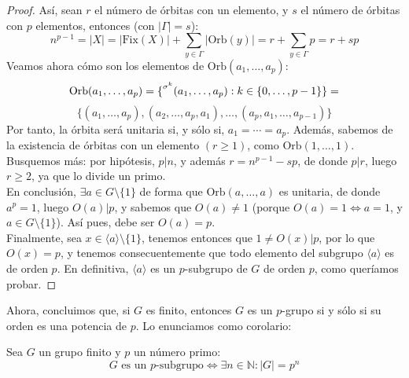 \documentclass[12pt]{article}
\newcommand{\N}{\mathbb{N}}
\newcommand{\Fix}{\text{Fix}}
\newcommand{\Orb}{\text{Orb}}
\begin{document}
\begin{ejercicio}
\begin{proof}
            Así, sean $r$ el número de órbitas con un elemento, y $s$ el número de órbitas con $p$ elementos, entonces (con $|\Gamma| = s$):
            $$n^{p-1} = |X| = |\Fix(X)| + \sum_{y \in \Gamma} |\Orb(y)| = r + \sum_{y \in \Gamma} p = r + sp$$
            Veamos ahora cómo son los elementos de $\Orb(a_1, \ldots, a_p)$:
            $$\Orb(a_1, \ldots, a_p) = \{\prescript{\sigma^{k}}{}{(a_1, \ldots, a_p)} : k \in \{0, \ldots, p-1\}\} = $$ 
            $$\{(a_1, \ldots, a_p), (a_2, \ldots, a_p, a_1), \ldots, (a_p, a_1, \ldots, a_{p-1})\}$$
            Por tanto, la órbita será unitaria si, y sólo si, $a_1 = \cdots = a_p$. Además, sabemos de la existencia de órbitas con un elemento $(r \geqslant 1)$, como $\Orb(1, \ldots, 1)$. Busquemos más: por hipótesis, $p | n$, y además $r = n^{p-1} - sp$, de donde $p | r$, luego $r \geqslant 2$, ya que lo divide un primo. \\

            En conclusión, $\exists a \in G \setminus \{1\}$ de forma que $\Orb(a, \ldots, a)$ es unitaria, de donde $a^{p} = 1$, luego $O(a) | p$, y sabemos que $O(a) \neq 1$ (porque $O(a) = 1 \iff a = 1$, y $a \in G \setminus \{1\}$). Así pues, debe ser $O(a) = p$. \\

            Finalmente, sea $x \in \langle a \rangle \setminus \{1\}$, tenemos entonces que $1 \neq O(x) | p$, por lo que $O(x) = p$, y tenemos consecuentemente que todo elemento del subgrupo $\langle a \rangle$ es de orden $p$. En definitiva, $\langle a \rangle$ es un $p$-subgrupo de $G$ de orden $p$, como queríamos probar.
        \end{proof}

        Ahora, concluimos que, si $G$ es finito, entonces $G$ es un $p$-grupo si y sólo si su orden es una potencia de $p$. Lo enunciamos como corolario:

        \begin{coro}
            Sea $G$ un grupo finito y $p$ un número primo:
            $$G \text{ es un $p$-subgrupo} \iff \exists n \in \N : |G| = p^{n}$$
        \end{coro}


\end{ejercicio}
\end{document}
